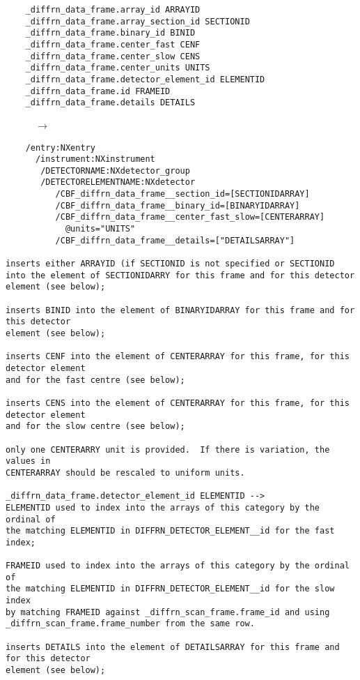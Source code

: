 \documentclass[11pt]{article}
\begin{document}
{{\begin{verbatim}     
    _diffrn_data_frame.array_id ARRAYID
    _diffrn_data_frame.array_section_id SECTIONID
    _diffrn_data_frame.binary_id BINID
    _diffrn_data_frame.center_fast CENF
    _diffrn_data_frame.center_slow CENS
    _diffrn_data_frame.center_units UNITS
    _diffrn_data_frame.detector_element_id ELEMENTID
    _diffrn_data_frame.id FRAMEID
    _diffrn_data_frame.details DETAILS
\end{verbatim}
~~~~~~{\bf{}$\rightarrow$}\\
\begin{verbatim}
    /entry:NXentry
      /instrument:NXinstrument
       /DETECTORNAME:NXdetector_group
       /DETECTORELEMENTNAME:NXdetector
          /CBF_diffrn_data_frame__section_id=[SECTIONIDARRAY]
          /CBF_diffrn_data_frame__binary_id=[BINARYIDARRAY]
          /CBF_diffrn_data_frame__center_fast_slow=[CENTERARRAY]
            @units="UNITS"
          /CBF_diffrn_data_frame__details=["DETAILSARRAY"]
                                 
inserts either ARRAYID (if SECTIONID is not specified or SECTIONID
into the element of SECTIONIDARRY for this frame and for this detector
element (see below);

inserts BINID into the element of BINARYIDARRAY for this frame and for this detector
element (see below);

inserts CENF into the element of CENTERARRAY for this frame, for this detector element
and for the fast centre (see below);

inserts CENS into the element of CENTERARRAY for this frame, for this detector element
and for the slow centre (see below);

only one CENTERARRY unit is provided.  If there is variation, the values in
CENTERARRAY should be rescaled to uniform units.

_diffrn_data_frame.detector_element_id ELEMENTID -->
ELEMENTID used to index into the arrays of this category by the ordinal of
the matching ELEMENTID in DIFFRN_DETECTOR_ELEMENT__id for the fast index;

FRAMEID used to index into the arrays of this category by the ordinal of
the matching ELEMENTID in DIFFRN_DETECTOR_ELEMENT__id for the slow index
by matching FRAMEID against _diffrn_scan_frame.frame_id and using
_diffrn_scan_frame.frame_number from the same row.

inserts DETAILS into the element of DETAILSARRAY for this frame and for this detector
element (see below);


\end{verbatim}}}
\end{document}

